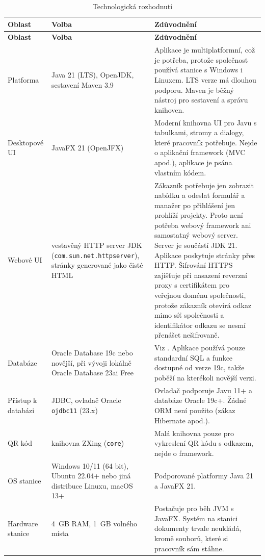 {\footnotesize
\begin{xltabular}{\textwidth}{lXX}
\caption{Technologická rozhodnutí}\\
\toprule
\textbf{Oblast} & \textbf{Volba} & \textbf{Zdůvodnění} \\
\midrule
\endfirsthead
\toprule
\textbf{Oblast} & \textbf{Volba} & \textbf{Zdůvodnění} \\
\midrule
\endhead
Platforma & Java 21 (LTS), OpenJDK, sestavení Maven 3.9 & Aplikace je multiplatformní, což je potřeba, protože společnost používá stanice s Windows i Linuxem. LTS verze má dlouhou podporu. Maven je běžný nástroj pro sestavení a správu knihoven. \\
Desktopové UI & JavaFX 21 (OpenJFX) & Moderní knihovna UI pro Javu s tabulkami, stromy a dialogy, které pracovník potřebuje. Nejde o aplikační framework (MVC apod.), aplikace je psána vlastním kódem. \\
Webové UI & vestavěný HTTP server JDK (\texttt{com.sun.net.httpserver}), stránky generované jako čisté HTML & Zákazník potřebuje jen zobrazit nabídku a odeslat formulář a manažer po přihlášení jen prohlíží projekty. Proto není potřeba webový framework ani samostatný webový server. Server je součástí JDK 21. Aplikace poskytuje stránky přes HTTP. Šifrování HTTPS zajišťuje při nasazení reverzní proxy s certifikátem pro veřejnou doménu společnosti, protože zákazník otevírá odkaz mimo síť společnosti a identifikátor odkazu se nesmí přenášet nešifrovaně. \\
Databáze & Oracle Database 19c nebo novější, při vývoji lokálně Oracle Database 23ai Free & Viz . Aplikace používá pouze standardní SQL a funkce dostupné od verze 19c, takže poběží na kterékoli novější verzi. \\
Přístup k databázi & JDBC, ovladač Oracle \texttt{ojdbc11} (23.x) & Ovladač podporuje Javu 11+ a databáze Oracle 19c+. Žádné ORM není použito (zákaz Hibernate apod.). \\
QR kód & knihovna ZXing (\texttt{core}) & Malá knihovna pouze pro vykreslení QR kódu s odkazem, nejde o framework. \\
OS stanice & Windows 10/11 (64 bit), Ubuntu 22.04+ nebo jiná distribuce Linuxu, macOS 13+ & Podporované platformy Java 21 a JavaFX 21. \\
Hardware stanice & 4~GB RAM, 1~GB volného místa & Postačuje pro běh JVM s JavaFX. Systém na stanici dokumenty trvale neukládá, kromě souborů, které si pracovník sám stáhne. \\

\end{xltabular}}

